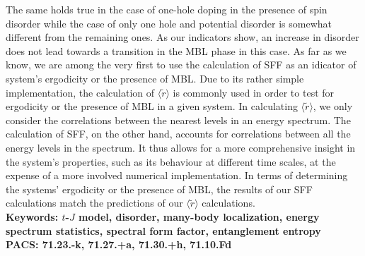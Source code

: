 The same holds true in the case of one-hole doping in the presence of spin disorder while the case of only one hole and potential disorder is somewhat different from the remaining ones. As our indicators show, an increase in disorder does not lead towards a transition in the MBL phase in this case. As far as we know, we are among the very first to use the calculation of SFF as an idicator of system's ergodicity or the presence of MBL. Due to its rather simple implementation, the calculation of $\langle\tilde{r}\rangle$ is commonly used in order to test for ergodicity or the presence of MBL in a given system. In calculating $\langle\tilde{r}\rangle$, we only consider the correlations between the nearest levels in an energy spectrum. The calculation of SFF, on the other hand, accounts for correlations between all the energy levels in the spectrum. It thus allows for a more comprehensive insight in the system's properties, such as its behaviour at different time scales, at the expense of a more involved numerical implementation. In terms of determining the systems' ergodicity or the presence of MBL, the results of our SFF calculations match the predictions of our $\langle\tilde{r}\rangle$ calculations. 
\vspace{1cm}\\
{\bf Keywords: $t$-$J$ model, disorder, many-body localization, energy spectrum statistics, spectral form factor, entanglement entropy}\\
{\bf PACS: 71.23.-k, 71.27.+a, 71.30.+h, 71.10.Fd}


\tableofcontents


\cleardoublepage{}
\renewcommand\listfigurename{Seznam slik}
\addcontentsline{toc}{chapter}{\listfigurename}
\listoffigures



\cleardoublepage


\pagestyle{fancy}
\fancyhead[CE,RE]{}
\fancyhead[LO,CO]{}
\fancyhead[LE]{\textbf{\nouppercase{\leftmark}}}
\fancyhead[RO]{\textbf{\nouppercase{\rightmark}}}






